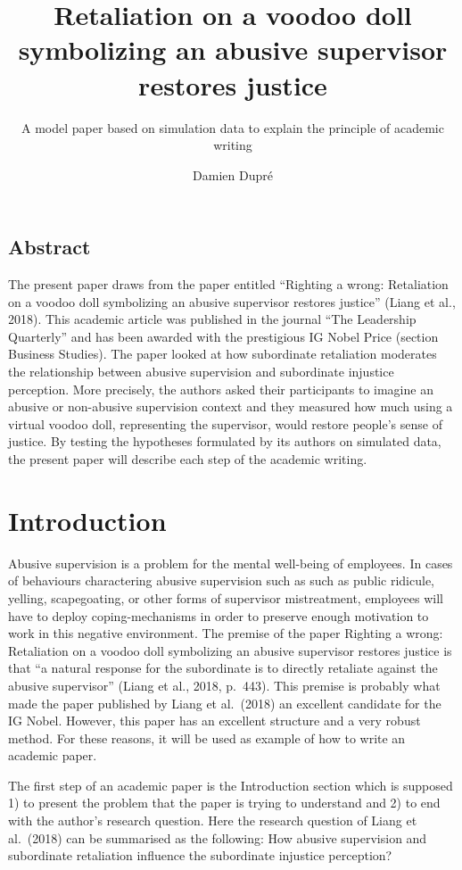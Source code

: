 \documentclass[
]{article}
\title{Retaliation on a voodoo doll symbolizing an abusive supervisor
restores justice}
\subtitle{A model paper based on simulation data to explain the
principle of academic writing}
\author{Damien Dupré}
\date{}
\begin{document}
\maketitle

\hypertarget{abstract}{%
\subsection{Abstract}\label{abstract}}

The present paper draws from the paper entitled ``Righting a wrong:
Retaliation on a voodoo doll symbolizing an abusive supervisor restores
justice'' (Liang et al., 2018). This academic article was published in
the journal ``The Leadership Quarterly'' and has been awarded with the
prestigious IG Nobel Price (section Business Studies). The paper looked
at how subordinate retaliation moderates the relationship between
abusive supervision and subordinate injustice perception. More
precisely, the authors asked their participants to imagine an abusive or
non-abusive supervision context and they measured how much using a
virtual voodoo doll, representing the supervisor, would restore people's
sense of justice. By testing the hypotheses formulated by its authors on
simulated data, the present paper will describe each step of the
academic writing.

\hypertarget{introduction}{%
\section{Introduction}\label{introduction}}

Abusive supervision is a problem for the mental well-being of employees.
In cases of behaviours charactering abusive supervision such as such as
public ridicule, yelling, scapegoating, or other forms of supervisor
mistreatment, employees will have to deploy coping-mechanisms in order
to preserve enough motivation to work in this negative environment. The
premise of the paper Righting a wrong: Retaliation on a voodoo doll
symbolizing an abusive supervisor restores justice is that ``a natural
response for the subordinate is to directly retaliate against the
abusive supervisor'' (Liang et al., 2018, p.~443). This premise is
probably what made the paper published by Liang et al.~(2018) an
excellent candidate for the IG Nobel. However, this paper has an
excellent structure and a very robust method. For these reasons, it will
be used as example of how to write an academic paper.

The first step of an academic paper is the Introduction section which is
supposed 1) to present the problem that the paper is trying to
understand and 2) to end with the author's research question. Here the
research question of Liang et al.~(2018) can be summarised as the
following: How abusive supervision and subordinate retaliation influence
the subordinate injustice perception?
\end{document}
